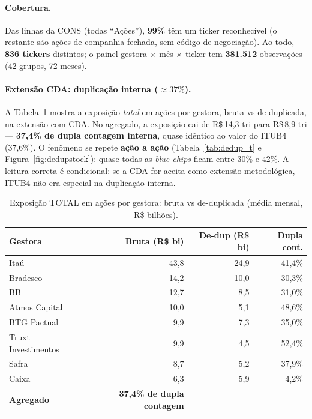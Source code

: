 \documentclass[12pt,a4paper]{article}
\begin{document}
\paragraph{Cobertura.} Das linhas da CONS (todas ``Ações''), \textbf{99\%} têm um ticker reconhecível (o
restante são ações de companhia fechada, sem código de negociação). Ao todo, \textbf{836 tickers} distintos;
o painel gestora $\times$ mês $\times$ ticker tem \textbf{381.512} observações (42 grupos, 72 meses).

\paragraph{Extensão CDA: duplicação interna ($\approx 37\%$).} A Tabela~\ref{tab:dedup_g} mostra a exposição
\emph{total} em ações por gestora, bruta vs de-duplicada, na extensão com CDA. No agregado, a exposição cai de
R\$\,14,3 tri para R\$\,8,9 tri --- \textbf{37,4\% de dupla contagem interna}, quase idêntico ao valor do
ITUB4 (37,6\%). O fenômeno se repete \textbf{ação a ação} (Tabela~\ref{tab:dedup_t} e
Figura~\ref{fig:dedupstock}): quase todas as \emph{blue chips} ficam entre 30\% e 42\%. A leitura correta é
condicional: se a CDA for aceita como extensão metodológica, ITUB4 não era especial na duplicação interna.

\begin{table}[H]\centering
\caption{Exposição TOTAL em ações por gestora: bruta vs de-duplicada (média mensal, R\$ bilhões).}
\label{tab:dedup_g}
\small
\begin{tabular}{lrrr}
\toprule
\textbf{Gestora} & \textbf{Bruta (R\$ bi)} & \textbf{De-dup (R\$ bi)} & \textbf{Dupla cont.} \\
\midrule
Itaú                   & 43,8 & 24,9 & 41,4\% \\
Bradesco               & 14,2 & 10,0 & 30,3\% \\
BB                     & 12,7 &  8,5 & 31,0\% \\
Atmos Capital          & 10,0 &  5,1 & 48,6\% \\
BTG Pactual            &  9,9 &  7,3 & 35,0\% \\
Truxt Investimentos    &  9,9 &  4,5 & 52,4\% \\
Safra                  &  8,7 &  5,2 & 37,9\% \\
Caixa                  &  6,3 &  5,9 &  4,2\% \\
\midrule
\textbf{Agregado}      & \textbf{37,4\% de dupla contagem} & & \\
\bottomrule
\end{tabular}
\end{table}
\end{document}

